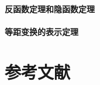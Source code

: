 \documentclass[zihao=-4,linespread=1.5,a4paper,heading=true,twoside]{ctexbook}
\theoremstyle{definition}
\theoremstyle{plain}
\begin{document}
\subsection{反函数定理和隐函数定理}


\subsection{等距变换的表示定理}


%



\newpage\part*{参考文献}
\printbibliography[heading=none]
\end{document}
